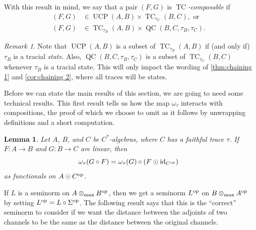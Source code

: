 \documentclass[11pt, a4paper, oneside, final, reqno]{amsart}
\newcommand{\UCP}{\operatorname{UCP}}
\newcommand{\QC}{\operatorname{QC}}
\newcommand{\TC}{\operatorname{TC}}
\newcommand{\id}{\operatorname{id}}
\theoremstyle{definition}
\theoremstyle{plain}
\newtheorem{lemma}[definition]{Lemma}
\theoremstyle{remark}
\newtheorem{remark}[definition]{Remark}
\numberwithin{equation}{section}
\begin{document}
With this result in mind, we say that a pair $(F,G)$ is \emph{$\TC$-composable} if
\begin{align*}
    (F,G) & \in \UCP(A,B) \times \TC_{\tau_C}(B,C), \text{ or } \\
    (F,G) & \in \TC_{\tau_B}(A,B) \times \QC(B,C,  \tau_B, \tau_C).
\end{align*}

\begin{remark}
    Note that $\UCP(A,B)$ is a subset of $\TC_{\tau_B}(A,B)$ if (and only if) $\tau_B$ is a tracial \emph{state}. Also, $\QC(B, C, \tau_B, \tau_C)$ is a subset of $\TC_{\tau_C}(B,C)$ whenever $\tau_B$ is a tracial state. This will only impact the wording of \cref{thm:chaining 1} and \cref{cor:chaining 2}, where all traces will be states.
\end{remark}

Before we can state the main results of this section, we are going to need some technical results. This first result tells us how the map $\omega_\tau$ interacts with compositions, the proof of which we choose to omit as it follows by unwrapping definitions and a short computation.

\begin{lemma}\label{lemma:associated functional of composition}
    Let $A$, $B$, and $C$ be $C^*$-algebras, where $C$ has a faithful trace $\tau$. If $F \colon A \to B$ and $G \colon B \to C$ are linear, then
    \begin{equation*}
        \omega_{\tau}(G \circ F) = \omega_{\tau}(G) \circ (F \odot \id_{C^{\rm op}})
    \end{equation*}
    as functionals on $A \odot C^{\rm op}$.
\end{lemma}


If $L$ is a seminorm on $A \otimes_{\rm max} B^{\rm op}$, then we get a seminorm $L^{\rm op}$ on $B \otimes_{\rm max} A^{\rm op}$ by setting $L^{\rm op} = L \circ \Sigma^{\rm op}$. The following result says that this is the ``correct'' seminorm to consider if we want the distance between the adjoints of two channels to be the same as the distance between the original channels.
\end{document}
